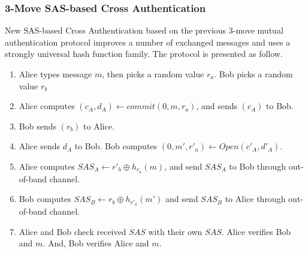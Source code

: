 \subsubsection*{3-Move SAS-based Cross Authentication}

New SAS-based Cross Authentication based on the previous 3-move mutual authentication protocol improves a number of exchanged messages and uses a strongly universal hash function family. The protocol is presented as follow. 
 
\begin{enumerate}
\item Alice types message $m$, then picks a random value $r_a$. Bob  picks a random value $r_b$
\item Alice computes $(c_A,d_A) \leftarrow commit(0,m,r_a)$, and sends $(c_A)$ to Bob.
\item Bob sends $(r_b)$ to Alice.
\item Alice sends $d_A$ to Bob. Bob computes $(0,m',r'_a) \leftarrow Open(c'_A,d'_A)$. 
\item Alice computes $SAS_A \leftarrow r'_b \oplus h_{r_a}(m)$, and send $SAS_A$ to Bob through out-of-band channel. 
\item Bob computes $SAS_B \leftarrow r_b \oplus h_{r'_a}(m')$ and send $SAS_B$ to Alice through out-of-band channel. 
\item Alice and Bob check received $SAS$ with their own $SAS$. Alice verifies Bob and $m$. And, Bob verifies Alice and $m$.
\end{enumerate}

